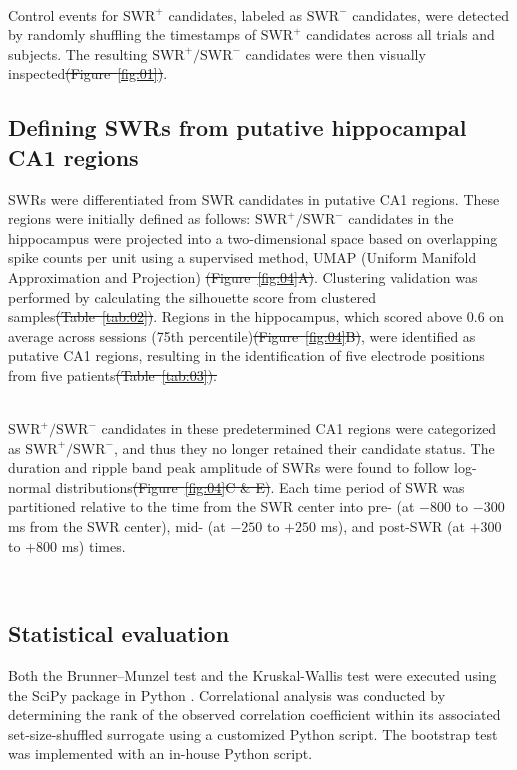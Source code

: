 \documentclass[final,3p,times,twocolumn]{elsarticle}
\providecommand{\DIFaddtex}[1]{{\protect\color{blue}\uwave{#1}}} %
\providecommand{\DIFdeltex}[1]{{\protect\color{red}\sout{#1}}}                      %
\providecommand{\DIFaddbegin}{} %
\providecommand{\DIFaddend}{} %
\providecommand{\DIFdelbegin}{} %
\providecommand{\DIFdelend}{} %
\providecommand{\DIFadd}[1]{\texorpdfstring{\DIFaddtex{#1}}{#1}} %
\providecommand{\DIFdel}[1]{\texorpdfstring{\DIFdeltex{#1}}{}} %
\newcommand{\DIFscaledelfig}{0.5}
\newlength{\DIFdelgraphicswidth} %
\newlength{\DIFdelgraphicsheight} %
\newcommand{\DIFaddincludegraphics}[2][]{{\color{blue}\fbox{\DIFOincludegraphics[#1]{#2}}}} %
\newcommand{\DIFdelincludegraphics}[2][]{%
\sbox{\DIFdelgraphicsbox}{\DIFOincludegraphics[#1]{#2}}%
\settoboxwidth{\DIFdelgraphicswidth}{\DIFdelgraphicsbox} %
\settoboxtotalheight{\DIFdelgraphicsheight}{\DIFdelgraphicsbox} %
\scalebox{\DIFscaledelfig}{%
\parbox[b]{\DIFdelgraphicswidth}{\usebox{\DIFdelgraphicsbox}\\[-\baselineskip] \rule{\DIFdelgraphicswidth}{0em}}\llap{\resizebox{\DIFdelgraphicswidth}{\DIFdelgraphicsheight}{%
\setlength{\unitlength}{\DIFdelgraphicswidth}%
\begin{picture}(1,1)%
\thicklines\linethickness{2pt} %
{\color[rgb]{1,0,0}\put(0,0){\framebox(1,1){}}}%
{\color[rgb]{1,0,0}\put(0,0){\line( 1,1){1}}}%
{\color[rgb]{1,0,0}\put(0,1){\line(1,-1){1}}}%
\end{picture}%
}\hspace*{3pt}}} %
} %
\DeclareRobustCommand{\DIFaddbegin}{\DIFOaddbegin \let\includegraphics\DIFaddincludegraphics} %
\DeclareRobustCommand{\DIFaddend}{\DIFOaddend \let\includegraphics\DIFOincludegraphics} %
\DeclareRobustCommand{\DIFdelbegin}{\DIFOdelbegin \let\includegraphics\DIFdelincludegraphics} %
\DeclareRobustCommand{\DIFdelend}{\DIFOaddend \let\includegraphics\DIFOincludegraphics} %
\begin{document}
\DIFdelend \DIFaddbegin \\
\indent
\DIFaddend Control events for $\textrm{SWR}^+$ candidates, labeled as $\textrm{SWR}^-$ candidates, were detected by randomly shuffling the timestamps of $\textrm{SWR}^+$ candidates across all trials and subjects. The resulting $\textrm{SWR}^+/\textrm{SWR}^-$ candidates were then visually inspected\DIFdelbegin \DIFdel{(Figure~\ref{fig:01})}\DIFdelend .

\subsection{Defining SWRs from putative hippocampal CA1 regions}
\DIFaddbegin \DIFadd{Potential }\DIFaddend SWRs were differentiated from SWR candidates in putative CA1 \DIFaddbegin \DIFadd{(cornu Ammonis 1) }\DIFaddend regions. These regions were initially defined as follows: $\textrm{SWR}^+/\textrm{SWR}^-$ candidates in the hippocampus were projected into a two-dimensional space based on overlapping spike counts per unit using a supervised method, UMAP (Uniform Manifold Approximation and Projection) \cite{mcinnes_umap_2018}\DIFdelbegin \DIFdel{(Figure~\ref{fig:04}A)}\DIFdelend . Clustering validation was performed by calculating the silhouette score \cite{rousseeuw_silhouettes_1987} from clustered samples\DIFdelbegin \DIFdel{(Table~\ref{tab:02})}\DIFdelend . Regions in the hippocampus, which scored above 0.6 on average across sessions (75th percentile)\DIFdelbegin \DIFdel{(Figure~\ref{fig:04}B)}\DIFdelend , were identified as putative CA1 regions, resulting in the identification of five electrode positions from five patients\DIFdelbegin \DIFdel{(Table~\ref{tab:03}).
}%

\DIFdelend \DIFaddbegin \DIFadd{.
}\\
\indent
\DIFaddend $\textrm{SWR}^+/\textrm{SWR}^-$ candidates in these predetermined CA1 regions were categorized as $\textrm{SWR}^+/\textrm{SWR}^-$, and thus they no longer retained their candidate status. The duration and ripple band peak amplitude of SWRs were found to follow log-normal distributions\DIFdelbegin \DIFdel{(Figure~\ref{fig:04}C \& E)}\DIFdelend . Each time period of SWR was partitioned relative to the time from the SWR center into pre- (at $-800$ to $-300$ ms from the SWR center), mid- (at $-250$ to $+250$ ms), and post-SWR (at $+300$ to $+800$ ms) times.
\DIFdelbegin %

\DIFdelend \DIFaddbegin \\
\indent
\DIFaddend \subsection{Statistical evaluation}
Both the Brunner--Munzel test and the Kruskal-Wallis test were executed using the SciPy package in Python \cite{virtanen_scipy_2020}. Correlational analysis was conducted by determining the rank of the observed correlation coefficient within its associated set-size-shuffled surrogate using a customized Python script. The bootstrap test was implemented with an in-house Python script.
\DIFdelbegin %
\end{document}
